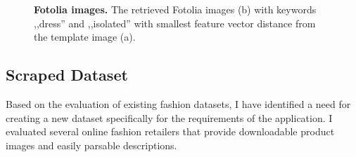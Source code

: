 \documentclass[12pt]{report}
\begin{document}
\begin{figure}[h]
\centering
{}\hspace{1cm}
\caption{\label{fig:fotolia} \textbf{Fotolia images.} The retrieved Fotolia images (b) with keywords ,,dress'' and ,,isolated'' with smallest feature vector distance from the template image (a).}
\end{figure}


\subsection{Scraped Dataset}
Based on the evaluation of existing fashion datasets, I have identified a need for creating a new dataset specifically for the requirements of the application. I evaluated several online fashion retailers that provide downloadable product images and easily parsable descriptions. 
\end{document}
